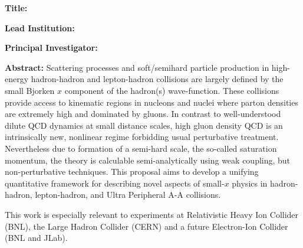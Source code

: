 %
\vspace{0.5em}
\noindent
{\bf Title:} \Title

\vspace{0.5em}
\noindent
{\bf Lead Institution:} \Institute

\vspace{0.5em}
\noindent
{\bf Principal Investigator:} \Investigator


\vspace{0.5em}
\noindent


\vspace{0.5em}
\noindent
{\bf Abstract:} 
Scattering processes and soft/semihard particle production in high-energy
hadron-hadron and lepton-hadron collisions are largely defined  by the 
small Bjorken $x$ component of the hadron(s) wave-function. 
These  collisions provide access to kinematic regions 
in nucleons and nuclei where parton densities are extremely high 
and dominated by gluons. In contrast to 
well-understood dilute QCD dynamics at small distance scales, 
high gluon density QCD is an intrinsically new, nonlinear regime
forbidding usual perturbative treatment. Nevertheless due to formation of a semi-hard scale, 
the so-called saturation momentum, the theory is calculable  semi-analytically using 
weak coupling, but non-perturbative techniques.
This proposal aims to develop  a unifying quantitative framework for 
describing  novel aspects of small-$x$ physics in hadron-hadron,
lepton-hadron, and Ultra Peripheral A-A collisions.

This work is especially relevant to experiments at  Relativistic Heavy Ion Collider (BNL),
the Large Hadron Collider (CERN) and a future Electron-Ion Collider (BNL and JLab).  




